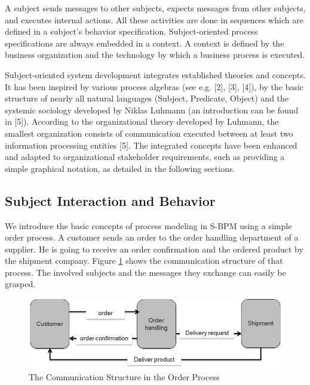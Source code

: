 A subject sends messages to other subjects, expects messages from other subjects, and executes internal actions. All these activities are done in sequences which are defined in a subject's behavior specification. Subject-oriented process specifications are always embedded in a context. A context is defined by the business organization and the technology by which a business process is executed.

Subject-oriented system development integrates established theories and concepts. It has been inspired by various process algebras (see e.g. [2], [3], [4]), by the basic structure of nearly all natural languages (Subject, Predicate, Object) and the systemic sociology developed by Niklas Luhmann (an introduction can be found in [5]). According to the organizational theory developed by Luhmann, the smallest organization consists of communication executed between at least two information processing entities [5]. The integrated concepts have been enhanced and adapted to organizational stakeholder requirements, such as providing a simple graphical notation, as detailed in the following sections.

\subsection{Subject Interaction and Behavior}

We introduce the basic concepts of process modeling in S-BPM using a simple order process. A customer sends an order to the order handling department of a supplier. He is going to receive an order confirmation and the ordered product by the shipment company. Figure \ref{fig:ordercomstructure} shows the communication structure of that process. The involved subjects and the messages they exchange can easily be grasped. 

\begin{figure}[htbp]
	\centering
	\includegraphics[width=0.7\linewidth]{Figures/Ontology/SubjectExecution/OrderComStructure}
	\caption[The Communication Structure in the Order Process]{The Communication Structure in the Order Process}
	\label{fig:ordercomstructure}
\end{figure}

